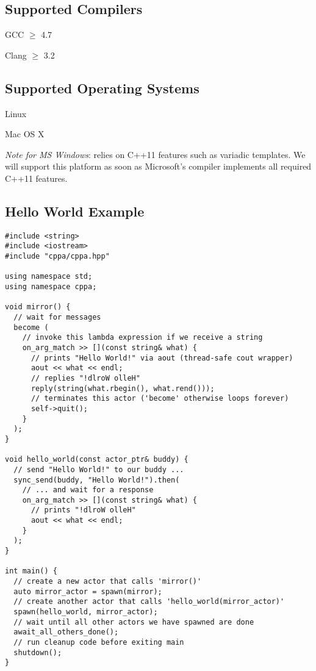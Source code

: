 \subsection{Supported Compilers}

\begin{itemize*}
  \item GCC $\ge$ 4.7
  \item Clang $\ge$ 3.2
\end{itemize*}

\subsection{Supported Operating Systems}

\begin{itemize*}
\item Linux
\item Mac OS X
\item \textit{Note for MS Windows}:
\libcppa relies on C++11 features such as variadic templates.
We will support this platform as soon as Microsoft's compiler implements all required C++11 features.
\end{itemize*}

\clearpage
\subsection{Hello World Example}

\begin{lstlisting}
#include <string>
#include <iostream>
#include "cppa/cppa.hpp"

using namespace std;
using namespace cppa;

void mirror() {
  // wait for messages
  become (
    // invoke this lambda expression if we receive a string
    on_arg_match >> [](const string& what) {
      // prints "Hello World!" via aout (thread-safe cout wrapper)
      aout << what << endl;
      // replies "!dlroW olleH"
      reply(string(what.rbegin(), what.rend()));
      // terminates this actor ('become' otherwise loops forever)
      self->quit();
    }
  );
}

void hello_world(const actor_ptr& buddy) {
  // send "Hello World!" to our buddy ...
  sync_send(buddy, "Hello World!").then(
    // ... and wait for a response
    on_arg_match >> [](const string& what) {
      // prints "!dlroW olleH"
      aout << what << endl;
    }
  );
}

int main() {
  // create a new actor that calls 'mirror()'
  auto mirror_actor = spawn(mirror);
  // create another actor that calls 'hello_world(mirror_actor)'
  spawn(hello_world, mirror_actor);
  // wait until all other actors we have spawned are done
  await_all_others_done();
  // run cleanup code before exiting main
  shutdown();
}
\end{lstlisting}
